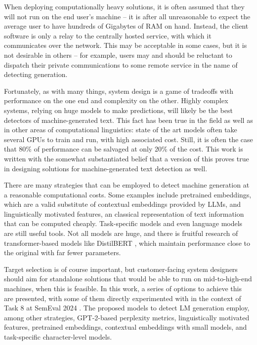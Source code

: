 When deploying computationally heavy solutions, it is often assumed that they will not run on the end user's machine -- it is after all unreasonable to expect the average user to have hundreds of Gigabytes of RAM on hand.
Instead, the client software is only a relay to the centrally hosted service, with which it communicates over the network.
This may be acceptable in some cases, but it is not desirable in others -- for example, users may and should be reluctant to dispatch their private communications to some remote service in the name of detecting generation.

Fortunately, as with many things, system design is a game of tradeoffs with performance on the one end and complexity on the other.
Highly complex systems, relying on huge models to make predictions, will likely be the best detectors of machine-generated text.
This fact has been true in the field as well as in other areas of computational linguistics: state of the art models often take several GPUs to train and run, with high associated cost.
Still, it is often the case that 80\% of performance can be salvaged at only 20\% of the cost.
This work is written with the somewhat substantiated belief that a version of this proves true in designing solutions for machine-generated text detection as well.

There are many strategies that can be employed to detect machine generation at a reasonable computational costs.
Some examples include pretrained embeddings, which are a valid substitute of contextual embeddings provided by LLMs, and linguistically motivated features, an classical representation of text information that can be computed cheaply.
Task-specific models and even language models are still useful tools.
Not all models are huge, and there is fruitful research of transformer-based models like DistilBERT \citep{sanh2020distilbertdistilledversionbert}, which maintain performance close to the original with far fewer parameters.

Target selection is of course important, but customer-facing system designers should aim for standalone solutions that would be able to run on mid-to-high-end machines, when this is feasible.
In this work, a series of options to achieve this are presented, with some of them directly experimented with in the context of Task 8 at SemEval 2024 \citep{wang2024semeval}.
The proposed models to detect LM generation employ, among other strategies, GPT-2-based perplexity metrics, linguistically motivated features, pretrained embeddings, contextual embeddings with small models, and task-specific character-level models.

